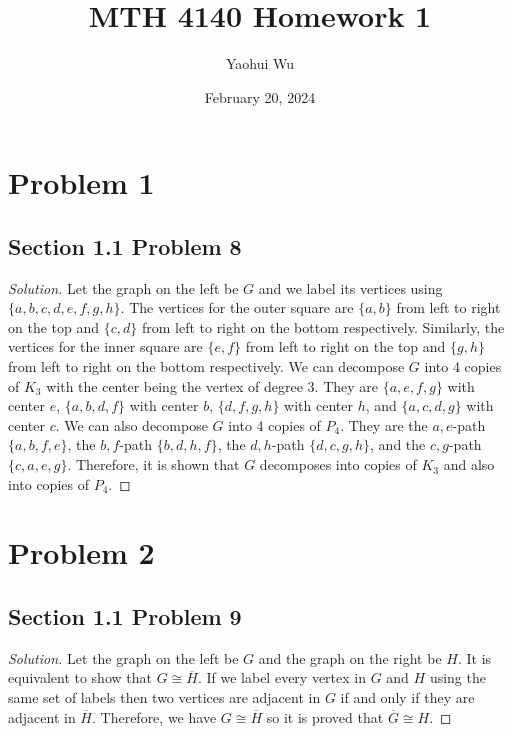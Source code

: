 \documentclass[12pt]{article}
\title{MTH 4140 Homework 1}
\author{Yaohui Wu}
\date{February 20, 2024}
\newenvironment{solution}{\begin{proof}[Solution]}{\end{proof}}
\begin{document}
\maketitle
\section*{Problem 1}
\subsection*{Section 1.1 Problem 8}
\begin{solution}
    Let the graph on the left be \(G\) and we label its vertices using
    \(\{a,b,c,d,e,f,g,h\}\). The vertices for the outer square are \(\{a,b\}\)
    from left to right on the top and \(\{c,d\}\) from left to right on the
    bottom respectively. Similarly, the vertices for the inner square are
    \(\{e,f\}\) from left to right on the top and \(\{g,h\}\) from left to right
    on the bottom respectively. We can decompose \(G\) into 4 copies of \(K_3\)
    with the center being the vertex of degree 3. They are \(\{a,e,f,g\}\) with
    center \(e\), \(\{a,b,d,f\}\) with center \(b\), \(\{d,f,g,h\}\) with center
    \(h\), and \(\{a,c,d,g\}\) with center \(c\). We can also decompose \(G\)
    into 4 copies of \(P_4\). They are the \(a,e\)-path \(\{a,b,f,e\}\), the
    \(b,f\)-path \(\{b,d,h,f\}\), the \(d,h\)-path \(\{d,c,g,h\}\), and the
    \(c,g\)-path \(\{c,a,e,g\}\). Therefore, it is shown that \(G\) decomposes
    into copies of \(K_3\) and also into copies of \(P_4\).
\end{solution}

\section*{Problem 2}
\subsection*{Section 1.1 Problem 9}
\begin{solution}
    Let the graph on the left be \(G\) and the graph on the right be \(H\). It
    is equivalent to show that \(G\cong\overline{H}\). If we label every vertex
    in \(G\) and \(H\) using the same set of labels then two vertices are
    adjacent in \(G\) if and only if they are adjacent in \(\overline{H}\).
    Therefore, we have \(G\cong\overline{H}\) so it is proved that \(\overline{G}\cong H\).
\end{solution}
\end{document}
